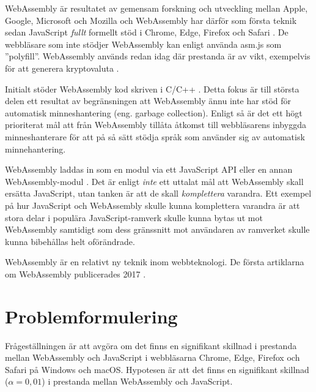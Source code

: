\documentclass[swedish,template=rapport]{his}
\begin{document}
WebAssembly är resultatet av gemensam forskning och utveckling mellan  Apple, Google, Microsoft och Mozilla \parencite{HaasRossbergSchuffTitzerHolmanGohmanWagnerZakaiBastien2017} och WebAssembly har därför som första teknik sedan JavaScript \emph{fullt} formellt stöd i Chrome, Edge, Firefox och Safari \parencite{Moller2018}. De webbläsare som inte stödjer WebAssembly kan enligt \textcite{HaasRossbergSchuffTitzerHolmanGohmanWagnerZakaiBastien2017} använda asm.js  som ''polyfill''. WebAssembly används redan idag där prestanda är av vikt, exempelvis för att generera kryptovaluta \parencite{RuthZimmermannWolsingHohlfeld2018}.

Initialt stöder WebAssembly kod skriven i C/C++ \parencite{HaasRossbergSchuffTitzerHolmanGohmanWagnerZakaiBastien2017}. Detta fokus är till största delen ett resultat av begränsningen att WebAssembly ännu inte har stöd för automatisk minneshantering (eng. garbage collection). Enligt \textcite{HaasRossbergSchuffTitzerHolmanGohmanWagnerZakaiBastien2017} så är det ett högt prioriterat mål att från WebAssembly tillåta åtkomst till webbläsarens inbyggda minneshanterare för att på så sätt stödja språk som använder sig av automatisk minnehantering.

WebAssembly laddas in som en modul via ett JavaScript API eller en annan WebAssembly-modul \parencite{HaasRossbergSchuffTitzerHolmanGohmanWagnerZakaiBastien2017}. Det är enligt \textcite{Moller2018} \emph{inte} ett uttalat mål att WebAssembly skall ersätta JavaScript, utan tanken är att de skall \emph{komplettera} varandra. Ett exempel på hur JavaScript och WebAssembly skulle kunna komplettera varandra är att stora delar i populära JavaScript-ramverk skulle kunna bytas ut mot WebAssembly samtidigt som dess gränssnitt mot användaren av ramverket skulle kunna bibehållas helt oförändrade.

WebAssembly är en relativt ny teknik inom webbteknologi. De första artiklarna om WebAssembly publicerades 2017 \parencite{HaasRossbergSchuffTitzerHolmanGohmanWagnerZakaiBastien2017,ReiserBlaser2017}.

\clearpage

\section{Problemformulering}

Frågeställningen är att avgöra om det finns en signifikant skillnad i prestanda mellan WebAssembly och JavaScript i webbläsarna Chrome, Edge, Firefox och Safari på Windows och macOS. Hypotesen är att det finns en signifikant skillnad ($\alpha = 0,01$) i prestanda mellan WebAssembly och JavaScript.
\end{document}
